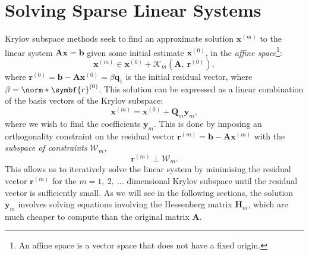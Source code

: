 \documentclass{article}
\begin{document}
\section{Solving Sparse Linear Systems}
Krylov subspace methods seek to find an approximate solution
\(\symbf{x}^{\left( m \right)}\) to the linear system \(\symbf{A}
\symbf{x} = \symbf{b}\) given some initial estimate \(\symbf{x}^{\left(
0 \right)}\), in the \textit{affine space}\footnote{An affine space is
a vector space that does not have a fixed origin.}:
\begin{equation*}
    \symbf{x}^{\left( m \right)} \in \symbf{x}^{\left( 0 \right)} + \mathcal{K}_m\left( \symbf{A},\: \symbf{r}^{\left( 0 \right)} \right),
\end{equation*}
where \(\symbf{r}^{\left( 0 \right)} = \symbf{b} - \symbf{A} \symbf{x}^{\left( 0 \right)} = \beta \symbf{q}_1\)
is the initial residual vector, where \(\beta = \norm*{\symbf{r}^{\left( 0 \right)}}\).
This solution can be expressed as a linear combination of the basis
vectors of the Krylov subspace:
\begin{equation*}
    \symbf{x}^{\left( m \right)} = \symbf{x}^{\left( 0 \right)} + \symbf{Q}_m \symbf{y}_m,
\end{equation*}
where we wish to find the coefficients \(\symbf{y}_m\). This is done by
imposing an orthogonality constraint on the residual vector
\(\symbf{r}^{\left( m \right)} = \symbf{b} - \symbf{A} \symbf{x}^{\left( m \right)}\)
with the \textit{subspace of constraints} \(\mathcal{W}_m\),
\begin{equation*}
    \symbf{r}^{\left( m \right)} \perp \mathcal{W}_m.
\end{equation*}
This allows us to iteratively solve the linear system by minimising the
residual vector \(\symbf{r}^{\left( m \right)}\) for the \(m = 1,\: 2,\: \ldots\)
dimensional Krylov subspace until the residual vector is sufficiently
small. As we will see in the following sections, the solution \(\symbf{y}_m\)
involves solving equations involving the Hessenberg matrix \(\symbf{H}_m\),
which are much cheaper to compute than the original matrix \(\symbf{A}\).
\end{document}

